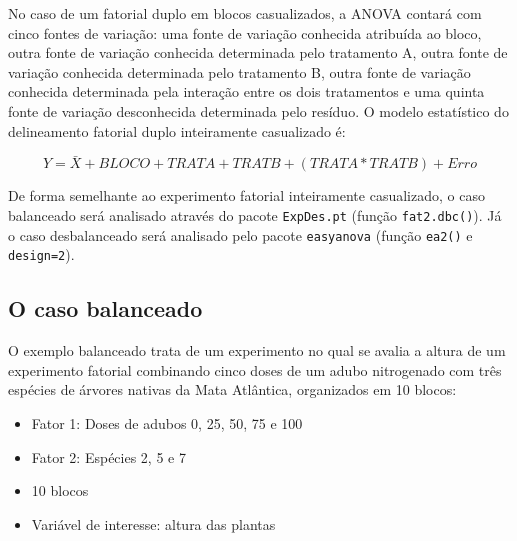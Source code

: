 \documentclass[
]{article}
\providecommand{\tightlist}{%
  \setlength{\itemsep}{0pt}\setlength{\parskip}{0pt}}
\begin{document}
No caso de um fatorial duplo em blocos casualizados, a ANOVA contará com cinco fontes de variação: uma fonte de variação conhecida atribuída ao bloco, outra fonte de variação conhecida determinada pelo tratamento A, outra fonte de variação conhecida determinada pelo tratamento B, outra fonte de variação conhecida determinada pela interação entre os dois tratamentos e uma quinta fonte de variação desconhecida determinada pelo resíduo. O modelo estatístico do delineamento fatorial duplo inteiramente casualizado é:

\[Y = \bar{X} + BLOCO + TRAT A + TRAT B + (TRAT A * TRAT B) + Erro\]

De forma semelhante ao experimento fatorial inteiramente casualizado, o caso balanceado será analisado através do pacote \texttt{ExpDes.pt} (função \texttt{fat2.dbc()}). Já o caso desbalanceado será analisado pelo pacote \texttt{easyanova} (função \texttt{ea2()} e \texttt{design=2}).

\hypertarget{o-caso-balanceado-3}{%
\subsection{O caso balanceado}\label{o-caso-balanceado-3}}

O exemplo balanceado trata de um experimento no qual se avalia a altura de um experimento fatorial combinando cinco doses de um adubo nitrogenado com três espécies de árvores nativas da Mata Atlântica, organizados em 10 blocos:

\begin{itemize}
\tightlist
\item
  Fator 1: Doses de adubos 0, 25, 50, 75 e 100
\item
  Fator 2: Espécies 2, 5 e 7
\item
  10 blocos
\item
  Variável de interesse: altura das plantas
\end{itemize}
\end{document}
